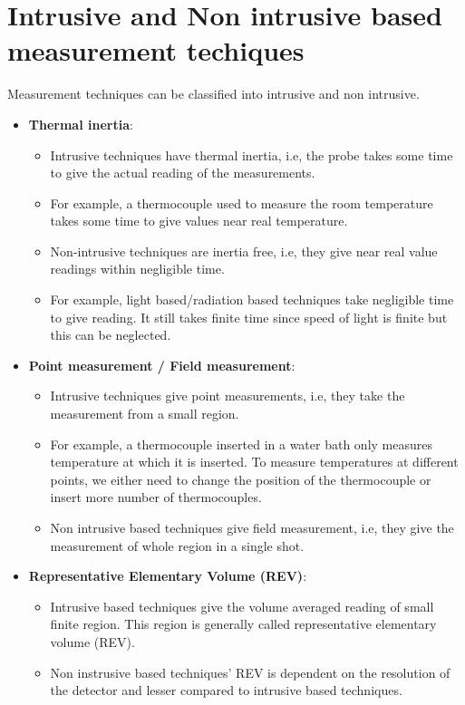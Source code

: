 \documentclass{article}
\begin{document}
\section{Intrusive and Non intrusive based measurement techiques}
Measurement techniques can be classified into intrusive and non intrusive.
\begin{itemize}
	\item \textbf{Thermal inertia}: 
	\begin{itemize}
		\item Intrusive techniques have thermal inertia, i.e, the probe takes some time to give the actual reading of the measurements. 
		\item For example, a thermocouple used to measure the room temperature takes some time to give values near real temperature.
		\item Non-intrusive techniques are inertia free, i.e, they give near real value readings within negligible time.
		\item For example, light based/radiation based techniques take negligible time to give reading. It still takes finite time since speed of light is finite but this can be neglected.
	\end{itemize}

	\item \textbf{Point measurement / Field measurement}:
	\begin{itemize}
		\item Intrusive techniques give point measurements, i.e, they take the measurement from a small region.
		\item For example, a thermocouple inserted in a water bath only measures temperature at which it is inserted. To measure temperatures at different points, we either need to change the position of the thermocouple or insert more number of thermocouples. 
		\item Non intrusive based techniques give field measurement, i.e, they give the measurement of whole region in a single shot.
	\end{itemize}

	\item \textbf{Representative Elementary Volume (REV)}:
	\begin{itemize}
		\item Intrusive based techniques give the volume averaged reading of small finite region. This region is generally called representative elementary volume (REV).
		\item Non instrusive based techniques' REV is dependent on the resolution of the detector and lesser compared to intrusive based techniques.
	\end{itemize}


\end{itemize}
\end{document}
